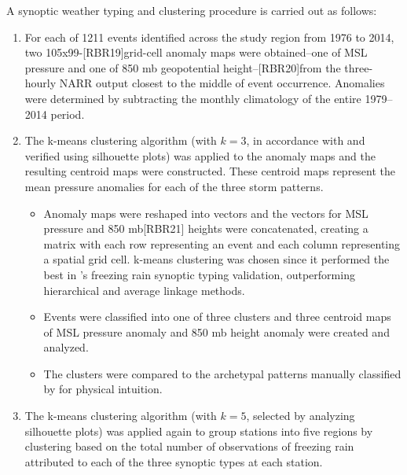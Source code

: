 \documentclass[twocol]{ametsoc}
\begin{document}
A synoptic weather typing and clustering procedure is carried out as follows:

\begin{enumerate}

\item

For each of 1211 events identified across the study region from 1976 to 2014, two 105x99-[RBR19]grid-cell anomaly maps were obtained--one of MSL pressure and one of 850 mb geopotential height--[RBR20]from the three-hourly NARR output closest to the middle of event occurrence. Anomalies were determined by subtracting the monthly climatology of the entire 1979--2014 period. 

\item

The k-means clustering algorithm (with $k=3$, in accordance with \citet{erfani2012automated} and verified using silhouette plots) was applied to the anomaly maps and the resulting centroid maps were constructed. These centroid maps represent the mean pressure anomalies for each of the three storm patterns.

\begin{itemize}

\item

Anomaly maps were reshaped into vectors and the vectors for MSL pressure and 850 mb[RBR21] heights were concatenated, creating a matrix with each row representing an event and each column representing a spatial grid cell. k-means clustering was chosen since it performed the best in \citet{erfani2012automated}'s freezing rain synoptic typing validation, outperforming hierarchical and average linkage methods.

\item

Events were classified into one of three clusters and three centroid maps of MSL pressure anomaly and 850 mb height anomaly were created and analyzed.

\item

The clusters were compared to the archetypal patterns manually classified by \citet{rauber2001synoptic} for physical intuition.

\end{itemize}

\item

The k-means clustering algorithm (with $k=5$, selected by analyzing silhouette plots) was applied again to group stations into five regions by clustering based on the total number of observations of freezing rain attributed to each of the three synoptic types at each station.


\end{enumerate}
\end{document}
